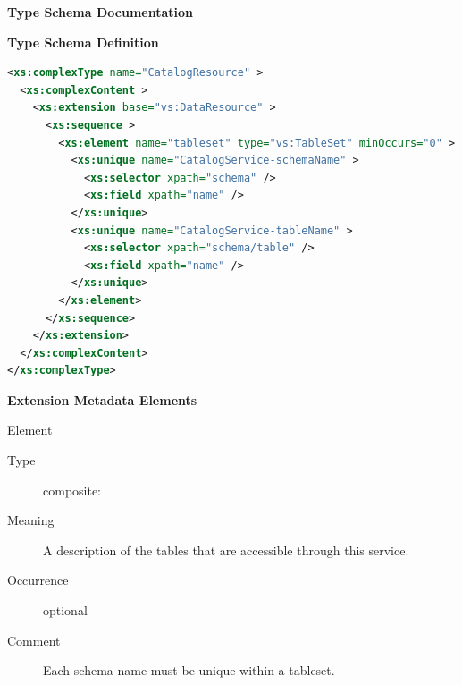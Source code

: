 \documentclass[11pt,a4paper]{ivoa}
\begin{document}
\begin{generated}
\begingroup
        \renewcommand*\descriptionlabel[1]{%
        \hbox to 5.5em{\emph{#1}\hfil}}\vspace{2ex}\noindent\textbf{ Type Schema Documentation}



\vspace{1ex}\noindent\textbf{ Type Schema Definition}

\begin{lstlisting}[language=XML,basicstyle=\footnotesize]
<xs:complexType name="CatalogResource" >
  <xs:complexContent >
    <xs:extension base="vs:DataResource" >
      <xs:sequence >
        <xs:element name="tableset" type="vs:TableSet" minOccurs="0" >
          <xs:unique name="CatalogService-schemaName" >
            <xs:selector xpath="schema" />
            <xs:field xpath="name" />
          </xs:unique>
          <xs:unique name="CatalogService-tableName" >
            <xs:selector xpath="schema/table" />
            <xs:field xpath="name" />
          </xs:unique>
        </xs:element>
      </xs:sequence>
    </xs:extension>
  </xs:complexContent>
</xs:complexType>
\end{lstlisting}

\vspace{0.5ex}\noindent\textbf{ Extension Metadata Elements}

\begingroup\small\begin{bigdescription}\item[Element \xmlel{tableset}]
\begin{description}
\item[Type] composite: 
\item[Meaning]
                       A description of the tables that are accessible
                       through this service.

\item[Occurrence] optional
\item[Comment]
                     	Each schema name must be unique within a tableset.


\end{description}


\end{bigdescription}\endgroup

\endgroup
\end{generated}
\end{document}
